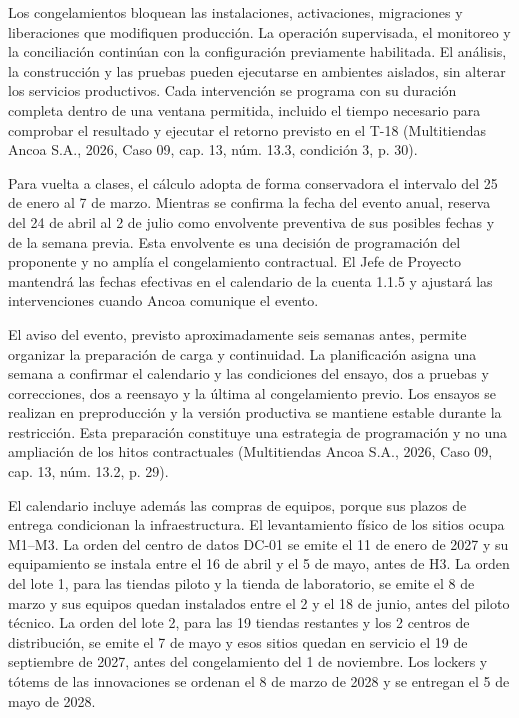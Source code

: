 \documentclass[11pt]{article}
\begin{document}
Los congelamientos bloquean las instalaciones, activaciones, migraciones y liberaciones que modifiquen producción. La operación supervisada, el monitoreo y la conciliación continúan con la configuración previamente habilitada. El análisis, la construcción y las pruebas pueden ejecutarse en ambientes aislados, sin alterar los servicios productivos. Cada intervención se programa con su duración completa dentro de una ventana permitida, incluido el tiempo necesario para comprobar el resultado y ejecutar el retorno previsto en el T-18 (Multitiendas Ancoa S.A., 2026, Caso 09, cap. 13, núm. 13.3, condición 3, p. 30).

Para vuelta a clases, el cálculo adopta de forma conservadora el intervalo del 25 de enero al 7 de marzo. Mientras se confirma la fecha del evento anual, reserva del 24 de abril al 2 de julio como envolvente preventiva de sus posibles fechas y de la semana previa. Esta envolvente es una decisión de programación del proponente y no amplía el congelamiento contractual. El Jefe de Proyecto mantendrá las fechas efectivas en el calendario de la cuenta 1.1.5 y ajustará las intervenciones cuando Ancoa comunique el evento.

El aviso del evento, previsto aproximadamente seis semanas antes, permite organizar la preparación de carga y continuidad. La planificación asigna una semana a confirmar el calendario y las condiciones del ensayo, dos a pruebas y correcciones, dos a reensayo y la última al congelamiento previo. Los ensayos se realizan en preproducción y la versión productiva se mantiene estable durante la restricción. Esta preparación constituye una estrategia de programación y no una ampliación de los hitos contractuales (Multitiendas Ancoa S.A., 2026, Caso 09, cap. 13, núm. 13.2, p. 29).

El calendario incluye además las compras de equipos, porque sus plazos de entrega condicionan la infraestructura. El levantamiento físico de los sitios ocupa M1--M3. La orden del centro de datos DC-01 se emite el 11 de enero de 2027 y su equipamiento se instala entre el 16 de abril y el 5 de mayo, antes de H3. La orden del lote 1, para las tiendas piloto y la tienda de laboratorio, se emite el 8 de marzo y sus equipos quedan instalados entre el 2 y el 18 de junio, antes del piloto técnico. La orden del lote 2, para las 19 tiendas restantes y los 2 centros de distribución, se emite el 7 de mayo y esos sitios quedan en servicio el 19 de septiembre de 2027, antes del congelamiento del 1 de noviembre. Los lockers y tótems de las innovaciones se ordenan el 8 de marzo de 2028 y se entregan el 5 de mayo de 2028.
\end{document}
